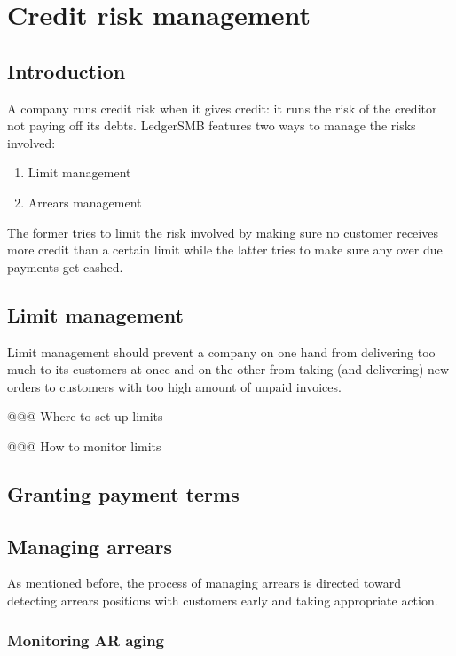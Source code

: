 \chapter{Credit risk management}
\label{cha:credit-risk-management}

\section{Introduction}

A company runs credit risk when it gives credit: it runs the risk of the
creditor not paying off its debts.  LedgerSMB features two ways to manage
the risks involved:

\begin{enumerate}
\item Limit management
\item Arrears management
\end{enumerate}

The former tries to limit the risk involved by making sure no customer
receives more credit than a certain limit while the latter tries to
make sure any over due payments get cashed.

\section{Limit management}

Limit management should prevent a company on one hand from delivering too much
to its customers at once and on the other from taking (and delivering) new orders
to customers with too high amount of unpaid invoices.



@@@ Where to set up limits

@@@ How to monitor limits



\section{Granting payment terms}

\section{Managing arrears}

As mentioned before, the process of managing arrears is directed toward
detecting arrears positions with customers early and taking appropriate
action.


\subsection{Monitoring AR aging}
\label{subsec-credit-risk-monitoring-arrears}

